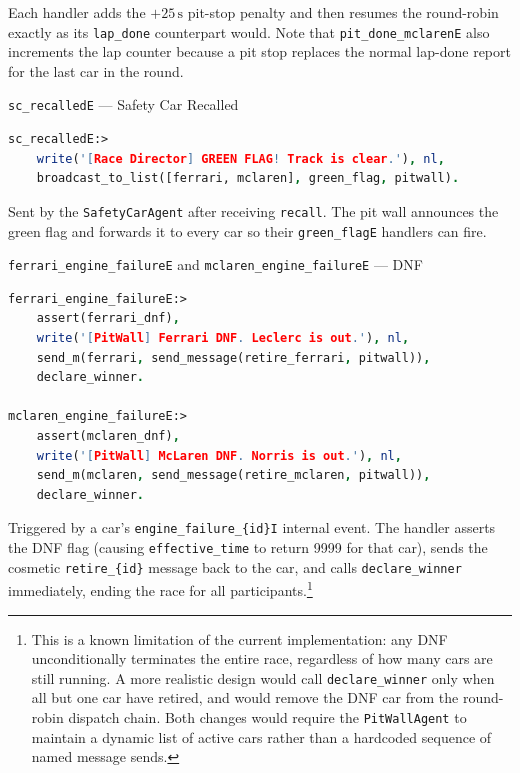 Each handler adds the $+25\,\text{s}$ pit-stop penalty and then resumes the
round-robin exactly as its \texttt{lap\_done} counterpart would. Note that
\texttt{pit\_done\_mclarenE} also increments the lap counter because a pit
stop replaces the normal lap-done report for the last car in the round.\\

\begin{minipage}{\linewidth}
\texttt{sc\_recalledE} --- Safety Car Recalled

\begin{lstlisting}[language=Prolog]
sc_recalledE:>
    write('[Race Director] GREEN FLAG! Track is clear.'), nl,
    broadcast_to_list([ferrari, mclaren], green_flag, pitwall).
\end{lstlisting}
\end{minipage}

Sent by the \texttt{SafetyCarAgent} after receiving \texttt{recall}. The pit
wall announces the green flag and forwards it to every car so their
\texttt{green\_flagE} handlers can fire.\\

\begin{minipage}{\linewidth}
\texttt{ferrari\_engine\_failureE} and \texttt{mclaren\_engine\_failureE} --- DNF

\begin{lstlisting}[language=Prolog]
ferrari_engine_failureE:>
    assert(ferrari_dnf),
    write('[PitWall] Ferrari DNF. Leclerc is out.'), nl,
    send_m(ferrari, send_message(retire_ferrari, pitwall)),
    declare_winner.

mclaren_engine_failureE:>
    assert(mclaren_dnf),
    write('[PitWall] McLaren DNF. Norris is out.'), nl,
    send_m(mclaren, send_message(retire_mclaren, pitwall)),
    declare_winner.
\end{lstlisting}
\end{minipage}

Triggered by a car's \texttt{engine\_failure\_\{id\}I} internal event. The
handler asserts the DNF flag (causing \texttt{effective\_time} to return 9999
for that car), sends the cosmetic \texttt{retire\_\{id\}} message back to the car, and calls \texttt{declare\_winner} immediately, ending the race for all
participants.\footnote{This is a known limitation of the current implementation: any DNF unconditionally terminates the entire race, regardless of how many cars are still running. A more realistic design would call \texttt{declare\_winner} only when all but one car have retired, and would remove the DNF car from the round-robin dispatch chain. Both changes would require the \texttt{PitWallAgent} to maintain a dynamic list of active cars rather than a hardcoded sequence of named message sends.}\\

